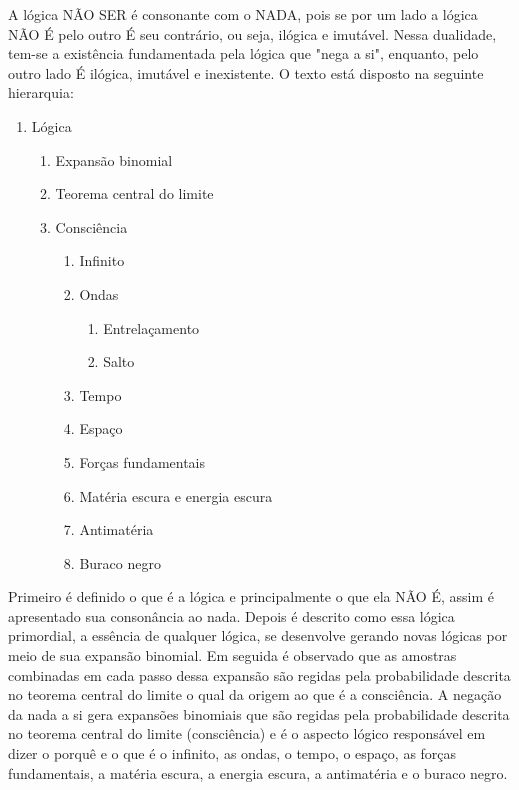 A lógica NÃO SER é consonante com o NADA, pois se por um lado a lógica NÃO É pelo outro É seu contrário, ou seja, ilógica e imutável. Nessa dualidade, tem-se a existência
fundamentada pela lógica que "nega a si", enquanto, pelo outro lado É ilógica, imutável e
inexistente. O texto está disposto na seguinte hierarquia:
{\scriptsize
\begin{enumerate}[label*=\arabic*.]
   \item Lógica
   \begin{enumerate}[label*=\arabic*.]
	   \item Expansão binomial
	   \item Teorema central do limite
	   \item Consciência
		   \begin{enumerate}[label*=\arabic*.]
			   \item Infinito
			   \item Ondas 
			   \begin{enumerate}[label*=\arabic*.]
			   		\item Entrelaçamento
			   		\item Salto
			   \end{enumerate}  
			   \item Tempo
			   \item Espaço
			   \item Forças fundamentais
			   \item Matéria escura e energia escura
			   \item Antimatéria
			   \item Buraco negro
		   \end{enumerate}   
   \end{enumerate}
\end{enumerate}
}
Primeiro é definido o que é a lógica e principalmente o que ela NÃO É, assim é apresentado sua consonância ao nada. Depois é descrito como essa lógica primordial, a essência de qualquer lógica, se desenvolve gerando novas lógicas por meio de sua expansão binomial. Em seguida é observado que as amostras combinadas em cada passo dessa expansão são regidas pela probabilidade descrita no teorema central do limite o qual da origem ao que é a consciência. A negação da nada a si gera expansões binomiais que são regidas pela probabilidade descrita no teorema central do limite (consciência) e é o aspecto lógico responsável em dizer o porquê e o que é o infinito, as ondas, o tempo, o espaço, as forças fundamentais, a matéria escura, a energia escura, a antimatéria e o buraco negro. 